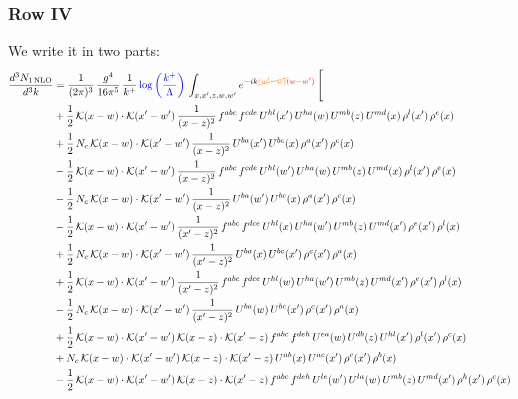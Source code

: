 \documentclass[9pt]{article}
\numberwithin{equation}{section}
\begin{document}
\subsubsection{Row IV}
We write it in two parts: 
\begin{align}
\frac{d^{3}N_{1\,\mathrm{NLO}}}{d^{3}k} & = \frac{1}{(2\pi)^{3}}\,\frac{g^{4}}{16\pi^{5}}\,\frac{1}{k^{+}}\,{\color{blue}\log{\left(\frac{k^{+}}{\Lambda}\right)}}\,\int_{x,x',z,w,w'}e^{-ik{\color{orange}\cancel{(w'-w)}}{\color{red}(w-w')}}\,\Bigg[\notag\\ & 
 +\frac{1}{2}\,\mathcal{K}(x-w)\cdot\mathcal{K}(x'-w')\,\frac{1}{(x-z)^{2}}\,f^{abc}\,f^{cde}\,U^{hl}(x')\,U^{ha}(w)\,U^{mb}(z)\,U^{md}(x)\,\rho^{l}(x')\,\rho^{e}(x)\notag\\
& +\frac{1}{2}\,N_{c}\,\mathcal{K}(x-w)\cdot\mathcal{K}(x'-w')\,\frac{1}{(x-z)^{2}}\,U^{ba}(x')\,U^{bc}(x)\,\rho^{a}(x')\,\rho^{c}(x)\notag\\
& -\frac{1}{2}\,\mathcal{K}(x-w)\cdot\mathcal{K}(x'-w')\,\frac{1}{(x-z)^{2}}\,f^{abc}\,f^{cde}\,U^{hl}(w')\,U^{ha}(w)\,U^{mb}(z)\,U^{md}(x)\,\rho^{l}(x')\,\rho^{e}(x)\notag\\
& -\frac{1}{2}\,N_{c}\,\mathcal{K}(x-w)\cdot\mathcal{K}(x'-w')\,\frac{1}{(x-z)^{2}}\,U^{ba}(w')\,U^{bc}(x)\,\rho^{a}(x')\,\rho^{c}(x)\notag\\
& -\frac{1}{2}\,\mathcal{K}(x-w)\cdot\mathcal{K}(x'-w')\,\frac{1}{(x'-z)^{2}}\,f^{abc}\,f^{dce}\,U^{hl}(x)\,U^{ha}(w')\,U^{mb}(z)\,U^{md}(x')\,\rho^{e}(x')\,\rho^{l}(x)\notag\\
& +\frac{1}{2}\,N_{c}\,\mathcal{K}(x-w)\cdot\mathcal{K}(x'-w')\,\frac{1}{(x'-z)^{2}}\,U^{ba}(x)\,U^{bc}(x')\,\rho^{c}(x')\,\rho^{a}(x)\notag\\
& +\frac{1}{2}\,\mathcal{K}(x-w)\cdot\mathcal{K}(x'-w')\,\frac{1}{(x'-z)^{2}}\,f^{abc}\,f^{dce}\,U^{hl}(w)\,U^{ha}(w')\,U^{mb}(z)\,U^{md}(x')\,\rho^{e}(x')\,\rho^{l}(x)\notag\\
& -\frac{1}{2}\,N_{c}\,\mathcal{K}(x-w)\cdot\mathcal{K}(x'-w')\,\frac{1}{(x'-z)^{2}}\,U^{ba}(w)\,U^{bc}(x')\,\rho^{c}(x')\,\rho^{a}(x)\notag\\
& +\frac{1}{2}\,\mathcal{K}(x-w)\cdot\mathcal{K}(x'-w')\,\mathcal{K}(x-z)\cdot\mathcal{K}(x'-z)\,f^{abc}\,f^{deh}\,U^{ea}(w)\,U^{db}(z)\,U^{hl}(x')\,\rho^{l}(x')\,\rho^{c}(x)\notag\\
& +N_{c}\,\mathcal{K}(x-w)\cdot\mathcal{K}(x'-w')\,\mathcal{K}(x-z)\cdot\mathcal{K}(x'-z)\,U^{ab}(x)\,U^{ac}(x')\,\rho^{c}(x')\,\rho^{b}(x)\notag\\
& -\frac{1}{2}\,\mathcal{K}(x-w)\cdot\mathcal{K}(x'-w')\,\mathcal{K}(x-z)\cdot\mathcal{K}(x'-z)\,f^{abc}\,f^{deh}\,U^{le}(w')\,U^{la}(w)\,U^{mb}(z)\,U^{md}(x')\,\rho^{h}(x')\,\rho^{c}(x)\notag\\

\end{align}
\end{document}
